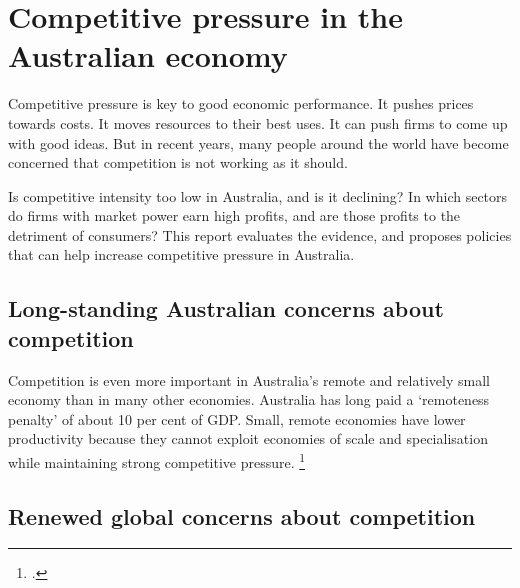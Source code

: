 \chapter{Competitive pressure in the Australian economy\label{chap:intro}}

Competitive pressure is key to good economic performance. It pushes prices towards costs. It moves resources to their best uses. It can push firms to come up with good ideas. But in recent years, many people around the world have become concerned that competition is not working as it should.

Is competitive intensity too low in Australia, and is it declining? In which sectors do firms with market power earn high profits, and are those profits to the detriment of consumers? This report evaluates the evidence, and proposes policies that can help increase competitive pressure in Australia.


\section{Long-standing Australian concerns about competition}

Competition is even more important in Australia's remote and relatively small economy than in many other economies. Australia has long paid a `remoteness penalty' of about 10 per cent of GDP\@. Small, remote economies have lower productivity because they cannot exploit economies of scale and specialisation while maintaining strong competitive pressure.%
\footcites{DolmanAusUSProd2007}{BattersbyDistance2006}


\section{Renewed global concerns about competition}

